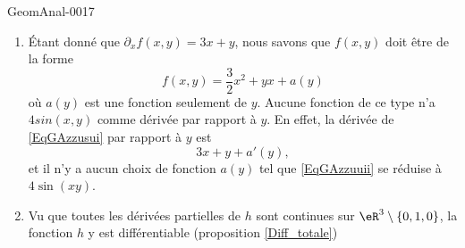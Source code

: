 \begin{corrige}{GeomAnal-0017}

    \begin{enumerate}
        \item
            Étant donné que \( \partial_xf(x,y)=3x+y\), nous savons que \( f(x,y)\) doit être de la forme
            \begin{equation}        \label{EqGAzzusui}
                f(x,y)=\frac{ 3 }{ 2 }x^2+yx+a(y)
            \end{equation}
            où \( a(y)\) est une fonction seulement de \( y\). Aucune fonction de ce type n'a \( 4sin(x,y)\) comme dérivée par rapport à \( y\). En effet, la dérivée de \eqref{EqGAzzusui} par rapport à \( y\) est
            \begin{equation}    \label{EqGAzzuuii}
                3x+y+a'(y),
            \end{equation}
            et il n'y a aucun choix de fonction \( a(y)\) tel que \eqref{EqGAzzuuii} se réduise à \( 4\sin(xy)\).

        \item
            Vu que toutes les dérivées partielles de \( h\) sont continues sur \( \eR^3\setminus\{ 0,1,0 \}\), la fonction \( h\) y est différentiable (proposition \ref{Diff_totale})
    \end{enumerate}


\end{corrige}
